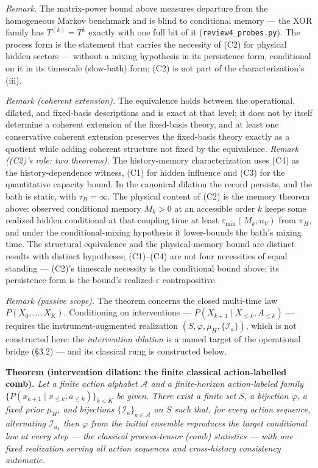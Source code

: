 \documentclass[
]{article}
\begin{document}
\emph{Remark.} The matrix-power bound above measures departure from the
homogeneous Markov benchmark and is blind to conditional memory --- the
XOR family has \(T^{(k)} = T^k\) exactly with one full bit of it
(\texttt{review4\_probes.py}). The process form is the statement that
carries the necessity of (C2) for physical hidden sectors --- without a
mixing hypothesis in its persistence form, conditional on it in its
timescale (slow-bath) form; (C2) is not part of the characterization's
(iii).

\emph{Remark (coherent extension).} The equivalence holds between the
operational, dilated, and fixed-basis descriptions and is exact at that
level; it does not by itself determine a coherent extension of the
fixed-basis theory, and at least one conservative coherent extension
preserves the fixed-basis theory exactly as a quotient while adding
coherent structure not fixed by the equivalence. \emph{Remark ((C2)'s
role: two theorems).} The history-memory characterization uses (C4) as
the history-dependence witness, (C1) for hidden influence and (C3) for
the quantitative capacity bound. In the canonical dilation the record
persists, and the bath is static, with \(\tau_B = \infty\). The physical
content of (C2) is the memory theorem above: observed conditional memory
\(M_k > 0\) at an accessible order \(k\) keeps some realized hidden
conditional at that coupling time at least
\(\varepsilon_{\min}(M_k, n_V)\) from \(\pi_H\), and under the
conditional-mixing hypothesis it lower-bounds the bath's mixing time.
The structural equivalence and the physical-memory bound are distinct
results with distinct hypotheses; (C1)--(C4) are not four necessities of
equal standing --- (C2)'s timescale necessity is the conditional bound
above; its persistence form is the bound's realized-\(\varepsilon\)
contrapositive.

\emph{Remark (passive scope).} The theorem concerns the closed
multi-time law \(P(X_0, \ldots, X_K)\). Conditioning on interventions
--- \(P(X_{k+1} \mid X_{\leq k}, A_{\leq k})\) --- requires the
instrument-augmented realization
\((S, \varphi, \mu_H, \{\mathcal{I}_a\})\), which is not constructed
here: the \emph{intervention dilation} is a named target of the
operational bridge (§3.2) --- and its classical rung is constructed
below.

\textbf{Theorem (intervention dilation: the finite classical
action-labelled comb).} \emph{Let a finite action alphabet
\(\mathcal{A}\) and a finite-horizon action-labeled family
\(\{P(x_{k+1} \mid x_{\leq k}, a_{\leq k})\}_{k < K}\) be given. There
exist a finite set \(S\), a bijection \(\varphi\), a fixed prior
\(\mu_H\), and bijections \(\{\mathcal{I}_a\}_{a \in \mathcal{A}}\) on
\(S\) such that, for every action sequence, alternating
\(\mathcal{I}_{a_k}\) then \(\varphi\) from the initial ensemble
reproduces the target conditional law at every step --- the classical
process-tensor (comb) statistics --- with one fixed realization serving
all action sequences and cross-history consistency automatic.}
\end{document}
